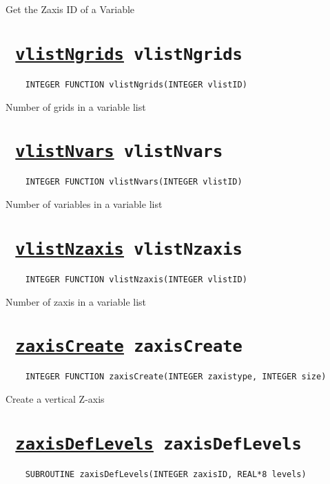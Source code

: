 Get the Zaxis ID of a Variable
\ifpdfoutput{}{(\ref{vlistInqVarZaxis})}


\section*{\texttt{ 
\ifpdf
\hyperref[vlistNgrids]{vlistNgrids}
\else
vlistNgrids
\fi
}}
\begin{verbatim}
    INTEGER FUNCTION vlistNgrids(INTEGER vlistID)
\end{verbatim}

Number of grids in a variable list
\ifpdfoutput{}{(\ref{vlistNgrids})}


\section*{\texttt{ 
\ifpdf
\hyperref[vlistNvars]{vlistNvars}
\else
vlistNvars
\fi
}}
\begin{verbatim}
    INTEGER FUNCTION vlistNvars(INTEGER vlistID)
\end{verbatim}

Number of variables in a variable list
\ifpdfoutput{}{(\ref{vlistNvars})}


\section*{\texttt{ 
\ifpdf
\hyperref[vlistNzaxis]{vlistNzaxis}
\else
vlistNzaxis
\fi
}}
\begin{verbatim}
    INTEGER FUNCTION vlistNzaxis(INTEGER vlistID)
\end{verbatim}

Number of zaxis in a variable list
\ifpdfoutput{}{(\ref{vlistNzaxis})}


\section*{\texttt{ 
\ifpdf
\hyperref[zaxisCreate]{zaxisCreate}
\else
zaxisCreate
\fi
}}
\begin{verbatim}
    INTEGER FUNCTION zaxisCreate(INTEGER zaxistype, INTEGER size)
\end{verbatim}

Create a vertical Z-axis
\ifpdfoutput{}{(\ref{zaxisCreate})}


\section*{\texttt{ 
\ifpdf
\hyperref[zaxisDefLevels]{zaxisDefLevels}
\else
zaxisDefLevels
\fi
}}
\begin{verbatim}
    SUBROUTINE zaxisDefLevels(INTEGER zaxisID, REAL*8 levels)
\end{verbatim}


